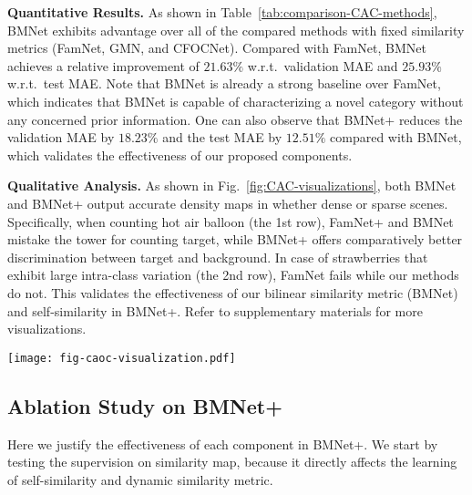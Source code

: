 \documentclass[10pt,twocolumn,letterpaper]{article}
\newcommand{\margin}{\vspace{3pt}\noindent}
\begin{document}
\margin
\textbf{Quantitative Results.}
As shown in Table~\ref{tab:comparison-CAC-methods}, BMNet exhibits advantage over all of the compared methods with fixed similarity metrics (FamNet, GMN, and CFOCNet).
Compared with FamNet, BMNet achieves a relative improvement of $21.63\%$ w.r.t.\ validation MAE and $25.93\%$ w.r.t.\ test MAE. Note that BMNet is already a strong baseline over FamNet, which indicates that BMNet is capable of characterizing a novel category without any concerned prior information. One can also observe that BMNet+ reduces the validation MAE by $18.23\%$ and the test MAE by $12.51\%$ compared with BMNet, which validates the effectiveness of our proposed components.

\margin
\textbf{Qualitative Analysis.}
As shown in Fig.~\ref{fig:CAC-visualizations}, both BMNet and BMNet+ output accurate density maps in whether dense or sparse scenes. Specifically, when counting hot air balloon (the 1st row), FamNet+ and BMNet mistake the tower for counting target, while BMNet+ offers comparatively better discrimination between target and background. In case of strawberries that exhibit large intra-class variation (the 2nd row), FamNet fails while our methods do not. This validates the effectiveness of our bilinear similarity metric (BMNet) and self-similarity in BMNet+. Refer to supplementary materials for more visualizations.

\begin{figure*}[t]
	\centering
	\texttt{[image: fig-caoc-visualization.pdf]}\vspace{-5pt}
	\caption{\textbf{Qualitative results on the FSC147 dataset.} The samples on the left exhibit significant intra-class variations such as scale, pose, and illumination condition. The red boxes 
indicate exemplars.
Counting values are shown at the top-right corner. Our BMNet and BMNet+ can predict accurate density maps in both dense and sparse scenes.
Best viewed by zooming in.
	}
	\label{fig:CAC-visualizations}
	\vspace{-5pt}
\end{figure*}

\subsection{Ablation Study on BMNet+}
\label{exp:sl}
Here we justify the effectiveness of each component in BMNet+.
We start by testing the supervision on similarity map, because it directly affects the learning of self-similarity and dynamic similarity metric.
\end{document}

